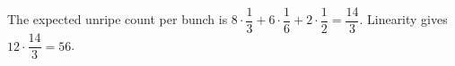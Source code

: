 The expected unripe count per bunch is $8\cdot\dfrac{1}{3}+6\cdot\dfrac{1}{6}+2\cdot\dfrac{1}{2}=\dfrac{14}{3}$. Linearity gives $12\cdot\dfrac{14}{3}=\boxed{56}$.
